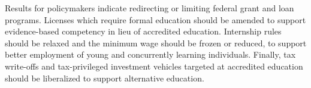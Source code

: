 \documentclass[AER]{./aea-latex-templates/AEA}
\begin{document}
        Results for policymakers indicate redirecting or limiting federal grant and loan programs.
        Licenses which require formal education should be amended to support evidence-based competency in lieu of accredited education.
        Internship rules should be relaxed and the minimum wage should be frozen or reduced,
        to support better employment of young and concurrently learning individuals.
        Finally, tax write-offs and tax-privileged
        investment vehicles targeted at accredited education should be liberalized
        to support alternative education.
        
        
        
        
        
\end{document}
